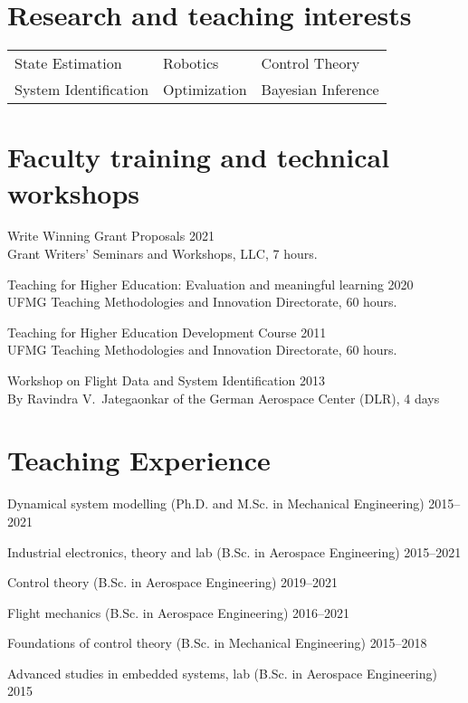 \documentclass[a4paper, 11pt, oneside]{memoir}
\begin{document}
\section{Research and teaching interests}
\begin{tabular}{lll}
  State Estimation & Robotics & Control Theory
  \\
  System Identification & Optimization & Bayesian Inference
\end{tabular}

\section{Faculty training and technical workshops}
\begin{description}
\item Write Winning Grant Proposals \hfill 2021
  \\
  Grant Writers' Seminars and Workshops, LLC, 7 hours.
\item Teaching for Higher Education: Evaluation and meaningful learning
  \hfill 2020
  \\
  UFMG Teaching Methodologies and Innovation Directorate, 60 hours.
\item Teaching for Higher Education Development Course \hfill 2011
  \\
  UFMG Teaching Methodologies and Innovation Directorate, 60 hours.
\item Workshop on Flight Data and System Identification \hfill 2013
  \\
  By Ravindra V.~Jategaonkar of the German Aerospace Center (DLR), 4 days
\end{description}

\clearpage

\section{Teaching Experience}
\begin{description}
\item 
{Dynamical system modelling (Ph.D. and M.Sc. in Mechanical Engineering)} \hfill {2015--2021}
\item 
{Industrial electronics, theory and lab (B.Sc. in Aerospace Engineering)} \hfill {2015--2021}
\item {Control theory (B.Sc. in Aerospace Engineering)} \hfill {2019--2021}
\item {Flight mechanics (B.Sc. in Aerospace Engineering)} \hfill {2016--2021}
\item {Foundations of control theory (B.Sc. in Mechanical Engineering)} \hfill {2015--2018}
\item 
{Advanced studies in embedded systems, lab (B.Sc. in Aerospace Engineering)} \hfill {2015}
\end{description}
\end{document}
